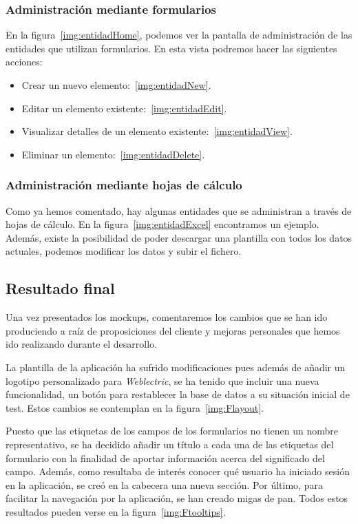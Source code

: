 \subsubsection{Administración mediante formularios} 

En la figura~\ref{img:entidadHome}, podemos ver la pantalla de administración de las entidades que utilizan formularios. En esta vista podremos hacer las siguientes acciones:

\begin{itemize}
	\item Crear un nuevo elemento:~\ref{img:entidadNew}.
	\item Editar un elemento existente:~\ref{img:entidadEdit}.
	\item Visualizar detalles de un elemento existente:~\ref{img:entidadView}.
	\item Eliminar un elemento:~\ref{img:entidadDelete}.
\end{itemize}

\subsubsection{Administración mediante hojas de cálculo} 

Como ya hemos comentado, hay algunas entidades que se administran a través de hojas de cálculo. En la figura~\ref{img:entidadExcel} encontramos un ejemplo. Además, existe la posibilidad de poder descargar una plantilla con todos los datos actuales, podemos modificar los datos y subir el fichero. 

\newpage

\subsection{Resultado final} 

Una vez presentados los mockups, comentaremos los cambios que se han ido produciendo a raíz de proposiciones del cliente y mejoras personales que hemos ido realizando durante el desarrollo.

La plantilla de la aplicación ha sufrido modificaciones pues además de añadir un logotipo personalizado para \textit{Weblectric}, se ha tenido que incluir una nueva funcionalidad, un botón para restablecer la base de datos a su situación inicial de test. Estos cambios se contemplan en la figura~\ref{img:Flayout}.

Puesto que las etiquetas de los campos de los formularios no tienen un nombre representativo, se ha decidido añadir un título a cada una de las etiquetas del formulario con la finalidad de aportar información acerca del significado del campo. Además, como resultaba de interés conocer qué usuario ha iniciado sesión en la aplicación, se creó en la cabecera una nueva sección. Por último, para facilitar la navegación por la aplicación, se han creado migas de pan. Todos estos resultados pueden verse en la figura~\ref{img:Ftooltips}.


